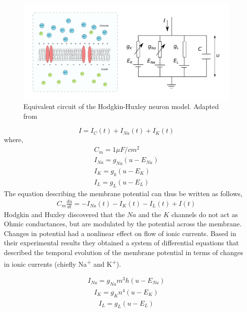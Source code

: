 \documentclass[10pt,letterpaper]{article}
\begin{document}
\begin{figure}[H]
\begin{center}
\includegraphics[scale=0.4]{Figures/fig7.pdf} 
\caption{Equivalent circuit of the Hodgkin-Huxley neuron model. Adapted from~\cite{Gerstner2014}}
\label{fig:HH}
\end{center}
\end{figure}

\begin{equation}
I = I_{C}(t) + I_{Na}(t) + I_{K}(t)
\end{equation}
where, 
\begin{eqnarray}
C_m = 1 \mu F/cm^2 \\
I_{Na} = g_{Na}(u-E_{Na})\\
I_{K} = g_{k}(u-E_K)\\
I_{L} = g_{L}(u-E_L)
\end{eqnarray}
The equation describing the membrane potential can thus be written as follows,
\begin{eqnarray}
\label{eq:HH}
C_m\frac{du}{dt}=−I_{Na}(t)−I_{K}(t)−I_{L}(t)+I(t)
\end{eqnarray}
Hodgkin and Huxley discovered that the $Na$ and the $K$ channels do not act as Ohmic conductances, but are modulated by the potential across the membrane. 
Changes in potential had a nonlinear effect on flow of ionic currents. Based in their experimental results they obtained a system of differential equations that described the temporal evolution of the membrane potential in terms of changes in ionic currents (chiefly Na\textsuperscript{+} and K\textsuperscript{+}). 

\begin{eqnarray}\label{d3_2}I_{Na} = g_{Na}m^3h(u−E_{Na})\end{eqnarray}
\begin{eqnarray}\label{d3_3}I_K = g_Kn^4(u−E_K)\end{eqnarray}
\begin{eqnarray}\label{d3_4}I_L = g_L(u−E_L)\end{eqnarray}
\end{document}
